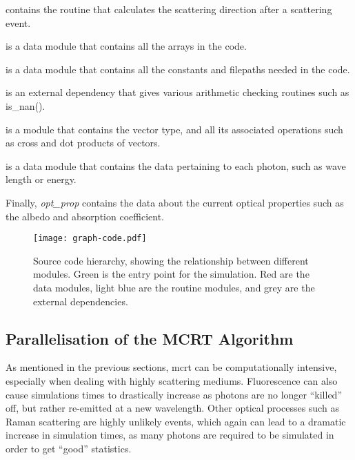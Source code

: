  contains the routine that calculates the scattering direction after a scattering event.

 is a data module that contains all the arrays in the code.

 is a data module that contains all the constants and filepaths needed in the code.

 is an external dependency that gives various arithmetic checking routines such as is_nan().

 is a module that contains the vector type, and all its associated operations such as cross and dot products of vectors.

 is a data module that contains the data pertaining to each photon, such as wave length or energy.

\noindent Finally, {\color{red} \textit{opt_prop}} contains the data about the current optical properties such as the albedo and absorption coefficient.


\begin{figure}[!ht]
	\centering
	\texttt{[image: graph-code.pdf]}
	\caption{Source code hierarchy, showing the relationship between different modules. Green is the entry point for the simulation. Red are the data modules, light blue are the routine modules, and grey are the external dependencies.}
	\label{fig:codegraph}
\end{figure}



\subsection*{Parallelisation of the MCRT Algorithm}\label{sec:parasec}

As mentioned in the previous sections, \gls*{mcrt} can be computationally intensive, especially when dealing with highly scattering mediums. Fluorescence can also cause simulations times to drastically increase as photons are no longer ``killed'' off, but rather re-emitted at a new wavelength. Other optical processes such as Raman scattering are highly unlikely events, which again can lead to a dramatic increase in simulation times, as many photons are required to be simulated in order to get ``good'' statistics.

